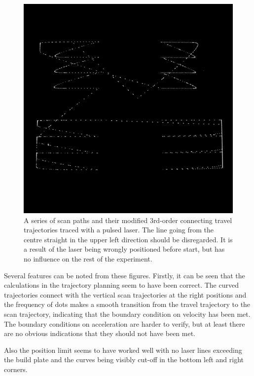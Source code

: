 \begin{figure}
    \centering
    \includegraphics[width=\linewidth]{Pictures/3rd-order-high-contrast.png}
    \caption{A series of scan paths and their modified 3rd-order connecting travel trajectories traced with a pulsed laser. The line going from the centre straight in the upper left direction should be disregarded. It is a result of the laser being wrongly positioned before start, but has no influence on the rest of the experiment.}
    \label{fig:3rd-order-high-contrast}
\end{figure}

Several features can be noted from these figures. Firstly, it can be seen that the calculations in the trajectory planning seem to have been correct. The curved trajectories connect with the vertical scan trajectories at the right positions and the frequency of dots makes a smooth transition from the travel trajectory to the scan trajectory, indicating that the boundary condition on velocity has been met. The boundary conditions on acceleration are harder to verify, but at least there are no obvious indications that they should not have been met.

Also the position limit seems to have worked well with no laser lines exceeding the build plate and the curves being visibly cut-off in the bottom left and right corners.

